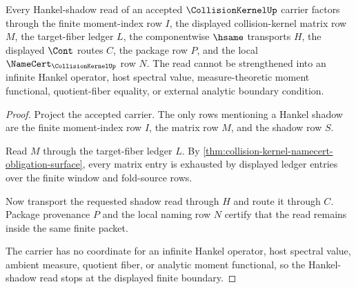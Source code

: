 \begin{theorem}
\label{thm:collision-kernel-hankel-shadow-boundary}
Every Hankel-shadow read of an accepted $\CollisionKernelUp$ carrier factors through the finite moment-index row $I$, the displayed collision-kernel matrix row $M$, the target-fiber ledger $L$, the componentwise $\hsame$ transports $H$, the displayed $\Cont$ routes $C$, the package row $P$, and the local $\NameCert_{\CollisionKernelUp}$ row $N$. The read cannot be strengthened into an infinite Hankel operator, host spectral value, measure-theoretic moment functional, quotient-fiber equality, or external analytic boundary condition.
\end{theorem}
\begin{proof}
Project the accepted carrier. The only rows mentioning a Hankel shadow are the finite moment-index row $I$, the matrix row $M$, and the shadow row $S$.

Read $M$ through the target-fiber ledger $L$. By \autoref{thm:collision-kernel-namecert-obligation-surface}, every matrix entry is exhausted by displayed ledger entries over the finite window and fold-source rows.

Now transport the requested shadow read through $H$ and route it through $C$. Package provenance $P$ and the local naming row $N$ certify that the read remains inside the same finite packet.

The carrier has no coordinate for an infinite Hankel operator, host spectral value, ambient measure, quotient fiber, or analytic moment functional, so the Hankel-shadow read stops at the displayed finite boundary.
\end{proof}

